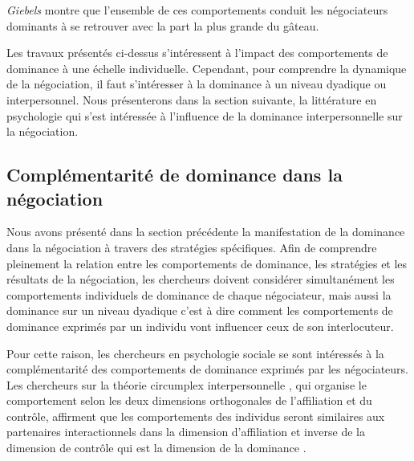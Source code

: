 	\emph{Giebels} \cite{giebels2000interdependence} montre que l'ensemble de ces comportements conduit les négociateurs dominants à se retrouver avec la part la plus grande du gâteau.
	
	Les travaux présentés ci-dessus s'intéressent à l'impact des comportements de dominance à une échelle individuelle. Cependant, pour comprendre la dynamique de la négociation, il faut s'intéresser à la dominance à un niveau dyadique ou interpersonnel. 
	Nous présenterons dans la section suivante, la littérature en psychologie qui s'est intéressée à l'influence de la dominance interpersonnelle sur la négociation. 

	\subsection{Complémentarité de dominance dans la négociation}
	\label{sec:compEtat}
	Nous avons présenté dans la section précédente la manifestation de la dominance dans la négociation à travers des stratégies spécifiques. Afin de comprendre pleinement la relation entre les comportements de dominance, les stratégies et les résultats de la négociation, les chercheurs doivent considérer simultanément les comportements individuels de dominance de chaque négociateur, mais aussi la dominance sur un niveau dyadique c'est à dire comment les comportements de dominance exprimés par un individu vont influencer ceux de son interlocuteur. 
	
	Pour cette raison, les chercheurs en psychologie sociale se sont intéressés à la complémentarité des comportements de dominance exprimés par les négociateurs. 
	Les chercheurs sur la théorie circumplex interpersonnelle \cite{wiggins1979psychological, kiesler19831982}, qui organise le comportement selon les deux dimensions orthogonales de l'affiliation et du contrôle,
	 affirment que les comportements des individus seront similaires aux partenaires interactionnels dans la dimension d'affiliation et inverse de la dimension de contrôle qui est la dimension de la dominance \cite{tiedens2003power}.
	
